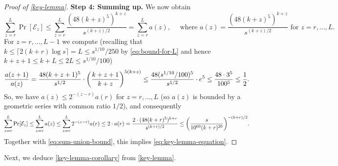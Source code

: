 \documentclass[english]{article}
\theoremstyle{remark}
\numberwithin{equation}{section}
\numberwithin{figure}{section}
\let\originalleft\left
\let\originalright\right
\renewcommand{\left}{\mathopen{}\mathclose\bgroup\originalleft}
\renewcommand{\right}{\aftergroup\egroup\originalright}
\begin{document}
\begin{proof}[Proof of \cref{key-lemma}]
\textbf{Step 4: Summing up.} We now obtain
\[\sum_{z=r}^{L} \Pr[\mathcal{E}_z]\le  \sum_{z=r}^{L}\frac{(48(k+z)^5)^{k+z}}{s^{(k+z)/2}}= \sum_{z=r}^{L}a(z),\quad \text{ where }a(z)=\frac{(48(k+z)^5)^{k+z}}{s^{(k+z)/2}}\text{ for }z=r,\dots,L.\]
For $z=r,\dots,L-1$ we compute (recalling that $k\le \lceil 2(k+r)\log s\rceil=L\le s^{1/10}/250$ by \cref{eq:bound-for-L} and hence $k+z+1\le k+L\le 2L\le s^{1/10}/100$)
\[\frac{a(z+1)}{a(z)}=\frac{48(k+z+1)^5}{s^{1/2}}\cdot \left(\frac{k+z+1}{k+z}\right)^{5(k+z)}
	\le \frac{48(s^{1/10}/100)^5}{s^{1/2}}\cdot e^5\le \frac{48\cdot 3^5}{100^5}\le \frac{1}{2}.\]
So, we have $a(z)\le 2^{-(z-r)}a(r)$ for $z=r,\dots,L$ (so $a(z)$ is bounded by a geometric series with common ratio $1/2$), and consequently
\[\sum_{z=r}^{L} \Pr[\mathcal{E}_z]\le  \sum_{z=r}^{L}a(z)\le \sum_{z=r}^{L}2^{-(z-r)}a(r)\le 2\cdot a(r)=\frac{2\cdot (48(k+r)^5)^{k+r}}{s^{(k+r)/2}}\le \left(\frac{s}{10^{60}(k+r)^{20}}\right)^{-(k+r)/2}.\]
Together with \cref{eq:sum-union-bound}, this implies \cref{eq:key-lemma-equation}.
\end{proof}

Next, we deduce \cref{key-lemma-corollary} from \cref{key-lemma}.
\end{document}
